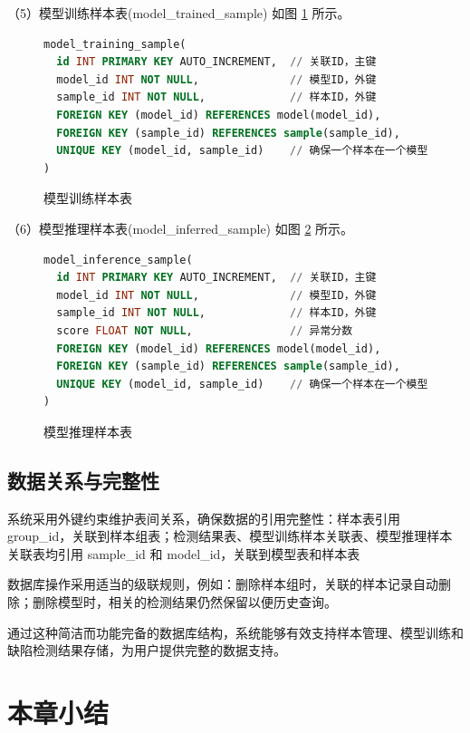 \documentclass[
  ]{njuthesis}
\begin{document}
（5）模型训练样本表(model\_trained\_sample) 如图 \ref{模型训练样本表} 所示。

\begin{figure}[H]
    \begin{lstlisting}[language=sql]
model_training_sample(
  id INT PRIMARY KEY AUTO_INCREMENT,  // 关联ID，主键
  model_id INT NOT NULL,              // 模型ID，外键
  sample_id INT NOT NULL,             // 样本ID，外键
  FOREIGN KEY (model_id) REFERENCES model(model_id),
  FOREIGN KEY (sample_id) REFERENCES sample(sample_id),
  UNIQUE KEY (model_id, sample_id)    // 确保一个样本在一个模型中只被训练一次
)
    \end{lstlisting}
    \caption{模型训练样本表}
    \label{模型训练样本表}
\end{figure}

（6）模型推理样本表(model\_inferred\_sample) 如图 \ref{模型推理样本表} 所示。

\begin{figure}[H]
    \begin{lstlisting}[language=sql]
model_inference_sample(
  id INT PRIMARY KEY AUTO_INCREMENT,  // 关联ID，主键
  model_id INT NOT NULL,              // 模型ID，外键
  sample_id INT NOT NULL,             // 样本ID，外键
  score FLOAT NOT NULL,               // 异常分数
  FOREIGN KEY (model_id) REFERENCES model(model_id),
  FOREIGN KEY (sample_id) REFERENCES sample(sample_id),
  UNIQUE KEY (model_id, sample_id)    // 确保一个样本在一个模型中只被记录一次
)
    \end{lstlisting}
    \caption{模型推理样本表}
    \label{模型推理样本表}
\end{figure}

\subsection{数据关系与完整性}

系统采用外键约束维护表间关系，确保数据的引用完整性：样本表引用 group\_id，关联到样本组表；检测结果表、模型训练样本关联表、模型推理样本关联表均引用 sample\_id 和 model\_id，关联到模型表和样本表

数据库操作采用适当的级联规则，例如：删除样本组时，关联的样本记录自动删除；删除模型时，相关的检测结果仍然保留以便历史查询。

通过这种简洁而功能完备的数据库结构，系统能够有效支持样本管理、模型训练和缺陷检测结果存储，为用户提供完整的数据支持。

\section{本章小结}
\end{document}

